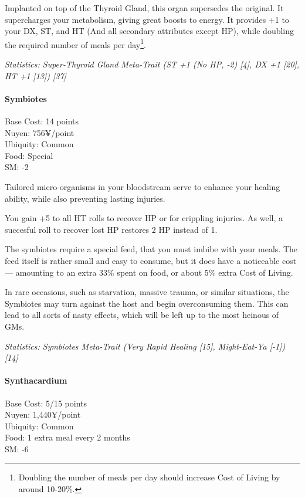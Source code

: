 \begin{multicols*}{3}
	Implanted on top of the Thyroid Gland, this organ supersedes the original. It supercharges your metabolism, giving great boosts to energy. It provides +1 to your DX, ST, and HT (And all secondary attributes except HP), while doubling the required number of meals per day\footnote{Doubling the number of meals per day should increase Cost of Living by around 10-20\%.}.
	
	\textit{\textcolor{OliveGreen}{Statistics: Super-Thyroid Gland Meta-Trait (ST +1 (No HP, -2) [4], DX +1 [20], HT +1 [13]) [37]}}
	
	\paragraph{Symbiotes}
	\begin{flushright}
		Base Cost: 14 points\\
		Nuyen: 756¥/point\\
		Ubiquity: Common\\
		Food: Special\\
		SM: -2\\
	\end{flushright}
	
	Tailored micro-organisms in your bloodstream serve to enhance your healing ability, while also preventing lasting injuries.
	
	You gain +5 to all HT rolls to recover HP or for crippling injuries. As well, a succesful roll to recover lost HP restores 2 HP instead of 1.
	
	The symbiotes require a special feed, that you must imbibe with your meals. The feed itself is rather small and easy to consume, but it does have a noticeable cost — amounting to an extra 33\% spent on food, or about 5\% extra Cost of Living.
	
	In rare occasions, such as starvation, massive trauma, or similar situations, the Symbiotes may turn against the host and begin overconsuming them. This can lead to all sorts of nasty effects, which will be left up to the most heinous of GMs.
	
	\textit{\textcolor{OliveGreen}{Statistics: Symbiotes Meta-Trait (Very Rapid Healing [15], Might-Eat-Ya [-1]) [14]}}
	
	\paragraph{Synthacardium}
	\begin{flushright}
		Base Cost: 5/15 points\\
		Nuyen: 1,440¥/point\\
		Ubiquity: Common\\
		Food: 1 extra meal every 2 months\\
		SM: -6\\
	\end{flushright}


\end{multicols*}
